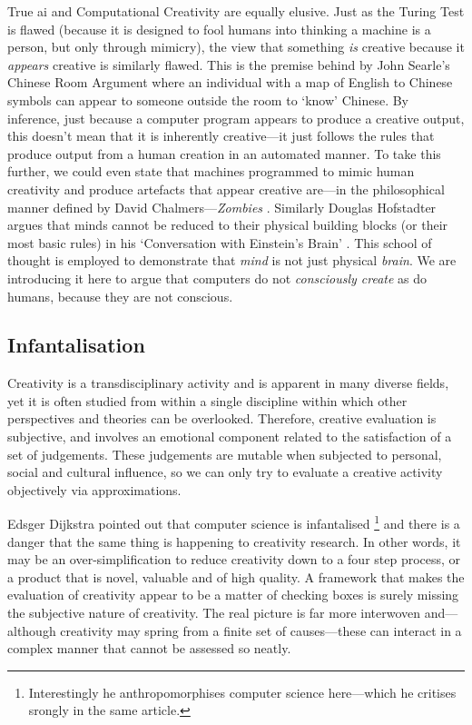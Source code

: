 True \gls{ai} and Computational Creativity are equally elusive. Just as the Turing Test \autocite{Turing1950} is flawed (because it is designed to fool humans into thinking a machine is a person, but only through mimicry), the view that something \emph{is} creative because it \emph{appears} creative is similarly flawed. This is the premise behind by John Searle's Chinese Room Argument \autocite{Searle1980} where an individual with a map of English to Chinese symbols can appear to someone outside the room to `know' Chinese. By inference, just because a computer program appears to produce a creative output, this doesn't mean that it is inherently creative---it just follows the rules that produce output from a human creation in an automated manner. To take this further, we could even state that machines programmed to mimic human creativity and produce artefacts that appear creative are---in the philosophical manner defined by David Chalmers---\emph{Zombies} \autocite{Chalmers1996}. Similarly Douglas Hofstadter argues that minds cannot be reduced to their physical building blocks (or their most basic rules) in his `Conversation with Einstein\rq s Brain' \autocite{Hofstadter1981}. This school of thought is employed to demonstrate that \emph{mind} is not just physical \emph{brain}. \colorbox{red!30}{We} are introducing it here to argue that computers do not \emph{consciously create} as do humans, because they are not conscious.

\subsection{Infantalisation}

Creativity is a transdisciplinary activity and is apparent in many diverse fields, yet it is often studied from within a single discipline within which other perspectives and theories can be overlooked. Therefore, creative evaluation is subjective, and involves an emotional component related to the satisfaction of a set of judgements. These judgements are mutable when subjected to personal, social and cultural influence, so we can only try to evaluate a creative activity objectively via approximations.

Edsger Dijkstra pointed out that computer science is infantalised \autocite{Dijkstra1988}\footnote{Interestingly he anthropomorphises computer science here---which he critises srongly in the same article.} and there is a danger that the same thing is happening to creativity research. In other words, it may be an over-simplification to reduce creativity down to a four step process, or a product that is novel, valuable and of high quality. A framework that makes the evaluation of creativity appear to be a matter of checking boxes is surely missing the subjective nature of creativity. The real picture is far more interwoven and---although creativity may spring from a finite set of causes---these can interact in a complex manner that cannot be assessed so neatly.

